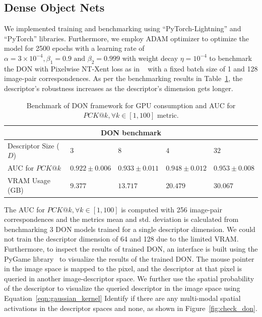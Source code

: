 \subsection{Dense Object Nets}
We implemented training and benchmarking using ``PyTorch-Lightning''\cite{falcon2019pytorch} and ``PyTorch''\cite{paszke2019pytorch} libraries.
Furthermore, we employ
ADAM\cite{kingma2014adam} optimizer to optimize the model for 2500 epochs with a learning rate of
$\alpha = 3 \times 10^{-4}, \beta_1 = 0.9 \text{ and } \beta_2 = 0.999$ with weight decay $\eta =10^{-4}$ to benchmark the DON with Pixelwise NT-Xent loss as in ~\cite{adrian2022efficient}
with a fixed batch size of 1 and 128 image-pair correspondences.
As per the benchmarking results in Table~\ref{table:don_training_results}, the descriptor's robustness increases as the descriptor's dimension gets longer.

\begin{table}[htb]
    \caption{Benchmark of DON framework for GPU consumption and AUC for $PCK@k,  \forall k \in [1, 100]$ metric.}
    \label{table:don_training_results}
    \centering
    \begin{tabular}{lllll}
        \toprule
        \multicolumn{5}{c}{DON benchmark}                                                                     \\
        \midrule
        Descriptor Size ($D$) & $3 $              & $8 $              & $4 $              & $32$              \\
        AUC for $PCK@k$       & $0.922 \pm 0.006$ & $0.933 \pm 0.011$ & $0.948 \pm 0.012$ & $0.953 \pm 0.008$ \\
        VRAM Usage (GB)       & $9.377 $          & $13.717 $         & $20.479 $         & $30.067$          \\
        \bottomrule
    \end{tabular}
\end{table}

The AUC for $PCK@k, \forall k \in [1, 100]$ is computed with 256 image-pair correspondences and
the metrics mean and std. deviation is calculated from benchmarking 3 DON models trained for a single descriptor dimension.
We could not train the descriptor dimension of 64 and 128 due to the limited VRAM. Furthermore, to inspect the
results of trained DON, an interface is built using the PyGame library~\cite{pygame} to visualize the results of the trained DON.
The mouse pointer in the image space is mapped to the pixel, and the descriptor at that pixel is queried in another image-descriptor space.
We further use the spatial probability of the descriptor to visualize the queried descriptor
in the image space using Equation~\ref{eqn:gaussian_kernel}
Identify if there are any multi-modal spatial activations in the descriptor spaces and none, as shown in Figure~\ref{fig:check_don}.

